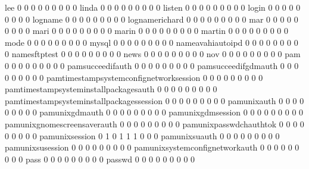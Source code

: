 \documentclass[compress,8pt]{beamer}
\begin{document}
\begin{frame}
\begin{Schunk}
  lee                                        0   0   0   0   0   0   0   0   0
  linda                                      0   0   0   0   0   0   0   0   0
  listen                                     0   0   0   0   0   0   0   0   0
  login                                      0   0   0   0   0   0   0   0   0
  logname                                    0   0   0   0   0   0   0   0   0
  lognamerichard                             0   0   0   0   0   0   0   0   0
  mar                                        0   0   0   0   0   0   0   0   0
  mari                                       0   0   0   0   0   0   0   0   0
  marin                                      0   0   0   0   0   0   0   0   0
  martin                                     0   0   0   0   0   0   0   0   0
  mode                                       0   0   0   0   0   0   0   0   0
  mysql                                      0   0   0   0   0   0   0   0   0
  nameavahiautoipd                           0   0   0   0   0   0   0   0   0
  namesftptest                               0   0   0   0   0   0   0   0   0
  news                                       0   0   0   0   0   0   0   0   0
  nov                                        0   0   0   0   0   0   0   0   0
  pam                                        0   0   0   0   0   0   0   0   0
  pamsucceedifauth                           0   0   0   0   0   0   0   0   0
  pamsucceedifgdmauth                        0   0   0   0   0   0   0   0   0
  pamtimestampsystemconfignetworksession     0   0   0   0   0   0   0   0   0
  pamtimestampsysteminstallpackagesauth      0   0   0   0   0   0   0   0   0
  pamtimestampsysteminstallpackagessession   0   0   0   0   0   0   0   0   0
  pamunixauth                                0   0   0   0   0   0   0   0   0
  pamunixgdmauth                             0   0   0   0   0   0   0   0   0
  pamunixgdmsession                          0   0   0   0   0   0   0   0   0
  pamunixgnomescreensaverauth                0   0   0   0   0   0   0   0   0
  pamunixpasswdchauthtok                     0   0   0   0   0   0   0   0   0
  pamunixsession                             0   1   0   1   1   1   0   0   0
  pamunixsuauth                              0   0   0   0   0   0   0   0   0
  pamunixsusession                           0   0   0   0   0   0   0   0   0
  pamunixsystemconfignetworkauth             0   0   0   0   0   0   0   0   0
  pass                                       0   0   0   0   0   0   0   0   0
  passwd                                     0   0   0   0   0   0   0   0   0

\end{Schunk}
\end{frame}
\end{document}
